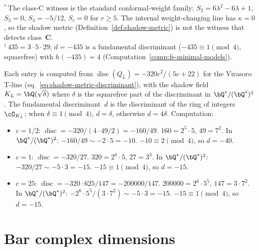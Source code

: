 \begin{table}[ht]
\smallskip\noindent
{\small
${}^*$\,The class-C witness is the standard conformal-weight family:
$S_2 = 6\lambda^2 - 6\lambda + 1$, $S_3 = 0$,
$S_4 = -5/12$, $S_r = 0$ for $r \geq 5$.
The internal weight-changing line has $\kappa = 0$, so the shadow
metric (Definition~\ref{def:shadow-metric}) is not the witness that
detects class~$\mathbf{C}$.\\
${}^\dagger$\,$435 = 3 \cdot 5 \cdot 29$;
$d = -435$ is a fundamental discriminant ($-435 \equiv 1 \pmod{4}$,
squarefree) with $h(-435) = 4$
\textup{(}Computation~\textup{\ref{comp:fe-minimal-models}}\textup{)}.
}
\end{table}

\noindent
Each entry is computed from $\operatorname{disc}(Q_L)
= -320c^2/(5c{+}22)$ for the Virasoro T-line
(eq.~\eqref{eq:shadow-metric-discriminant}),
with the shadow field $K_L = \bQ(\sqrt{\delta})$
where $\delta$ is the squarefree part of the discriminant
in $\bQ^*/(\bQ^*)^2$.
The fundamental discriminant~$d$ is the discriminant
of the ring of integers $\cO_{K_L}$; when $\delta \equiv 1
\pmod 4$, $d = \delta$, otherwise $d = 4\delta$.
Computation:
\begin{itemize}[nosep]
\item $c = 1/2$:
 $\operatorname{disc} = -320/(4 \cdot 49/2) = -160/49$.
 $160 = 2^5 \cdot 5$, $49 = 7^2$.
 In $\bQ^*/(\bQ^*)^2$: $-160/49 \sim -2 \cdot 5 = -10$.
 $-10 \equiv 2 \pmod{4}$, so $d = -40$.
\item $c = 1$:
 $\operatorname{disc} = -320/27$.
 $320 = 2^6 \cdot 5$, $27 = 3^3$.
 In $\bQ^*/(\bQ^*)^2$: $-320/27 \sim -5 \cdot 3 = -15$.
 $-15 \equiv 1 \pmod{4}$, so $d = -15$.
\item $c = 25$:
 $\operatorname{disc} = -320 \cdot 625/147 = -200000/147$.
 $200000 = 2^6 \cdot 5^5$, $147 = 3 \cdot 7^2$.
 In $\bQ^*/(\bQ^*)^2$: $-2^6 \cdot 5^5/(3 \cdot 7^2)
 \sim -5 \cdot 3 = -15$.
 $-15 \equiv 1 \pmod{4}$, so $d = -15$.
\end{itemize}


\section*{Bar complex dimensions}
\label{sec:bar-dimensions}

